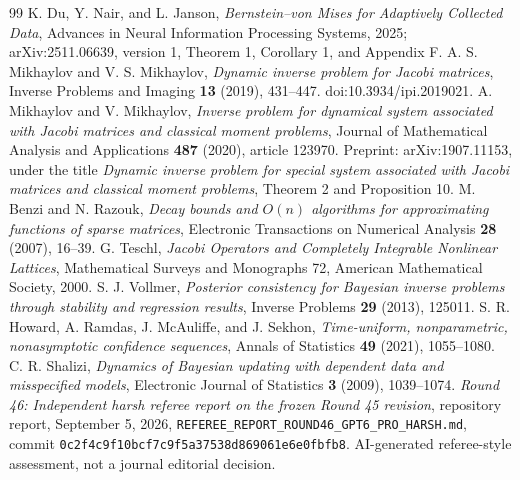 \begin{thebibliography}{99}
 K. Du, Y. Nair, and L. Janson,
\emph{Bernstein--von Mises for Adaptively Collected Data},
Advances in Neural Information Processing Systems, 2025;
arXiv:2511.06639, version 1, Theorem 1, Corollary 1, and Appendix F.
 A. S. Mikhaylov and V. S. Mikhaylov,
\emph{Dynamic inverse problem for Jacobi matrices},
Inverse Problems and Imaging \textbf{13} (2019), 431--447.
doi:10.3934/ipi.2019021.
 A. Mikhaylov and V. Mikhaylov,
\emph{Inverse problem for dynamical system associated with Jacobi matrices
and classical moment problems}, Journal of Mathematical Analysis and
Applications \textbf{487} (2020), article 123970.
Preprint: arXiv:1907.11153, under the title
\emph{Dynamic inverse problem for special system associated with Jacobi
matrices and classical moment problems}, Theorem 2 and Proposition 10.
 M. Benzi and N. Razouk,
\emph{Decay bounds and $O(n)$ algorithms for approximating functions of sparse
matrices}, Electronic Transactions on Numerical Analysis \textbf{28}
(2007), 16--39.
 G. Teschl, \emph{Jacobi Operators and Completely Integrable
Nonlinear Lattices}, Mathematical Surveys and Monographs 72,
American Mathematical Society, 2000.
 S. J. Vollmer,
\emph{Posterior consistency for Bayesian inverse problems through stability
and regression results}, Inverse Problems \textbf{29} (2013), 125011.
 S. R. Howard, A. Ramdas, J. McAuliffe, and J. Sekhon,
\emph{Time-uniform, nonparametric, nonasymptotic confidence sequences},
Annals of Statistics \textbf{49} (2021), 1055--1080.
 C. R. Shalizi,
\emph{Dynamics of Bayesian updating with dependent data and misspecified
models}, Electronic Journal of Statistics \textbf{3} (2009), 1039--1074.
 \emph{Round 46: Independent harsh referee report on the frozen
Round 45 revision}, repository report, September 5, 2026,
\texttt{REFEREE\_REPORT\_ROUND46\_GPT6\_PRO\_HARSH.md},
commit \texttt{0c2f4c9f10bcf7c9f5a37538d869061e6e0fbfb8}.
AI-generated referee-style assessment, not a journal editorial decision.
\end{thebibliography}
